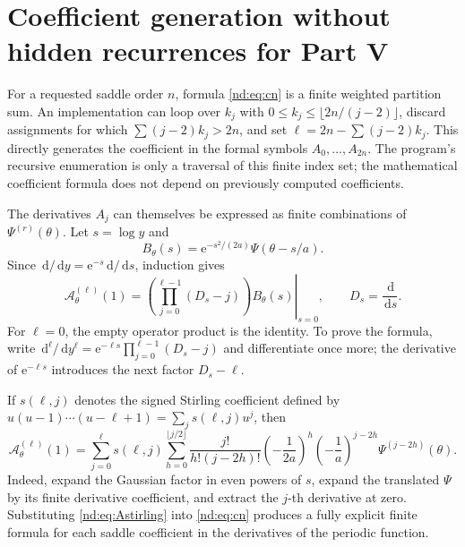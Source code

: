 \documentclass[11pt,a4paper,oneside,openany]{book}
\numberwithin{equation}{chapter}
\theoremstyle{definition}
\theoremstyle{remark}
\newcommand{\dd}{\,\mathrm d}
\newcommand{\e}{\mathrm e}
\begin{document}
\chapter{Coefficient generation without hidden recurrences for Part V}
\label{nd:app:coefficients}

For a requested saddle order \(n\), formula \eqref{nd:eq:cn} is a finite weighted
partition sum. An implementation can loop over \(k_j\) with
\(0\le k_j\le\lfloor2n/(j-2)\rfloor\), discard assignments for which
\(\sum(j-2)k_j>2n\), and set
\(\ell=2n-\sum(j-2)k_j\). This directly generates the coefficient in the
formal symbols \(A_0,\ldots,A_{2n}\). The program's recursive enumeration is
only a traversal of this finite index set; the mathematical coefficient formula
does not depend on previously computed coefficients.

The derivatives \(A_j\) can themselves be expressed as finite combinations of
\(\Psi^{(r)}(\theta)\). Let \(s=\log y\) and
\[
 B_\theta(s)=\e^{-s^2/(2a)}\Psi(\theta-s/a).
\]
Since \(\dd/\dd y=\e^{-s}\dd/\dd s\), induction gives
\begin{equation}
 \mathcal A_\theta^{(\ell)}(1)
 =\left.\left(\prod_{j=0}^{\ell-1}(D_s-j)\right)
                            B_\theta(s)\right|_{s=0},
 \qquad D_s=\frac{\dd}{\dd s}.
 \label{nd:eq:Aoperator}
\end{equation}
For \(\ell=0\), the empty operator product is the identity. To prove the
formula, write
\(\dd^\ell/\dd y^\ell=\e^{-\ell s}\prod_{j=0}^{\ell-1}(D_s-j)\)
and differentiate once more; the derivative of \(\e^{-\ell s}\) introduces
the next factor \(D_s-\ell\).

If \(s(\ell,j)\) denotes the signed Stirling coefficient defined by
\(u(u-1)\cdots(u-\ell+1)=\sum_js(\ell,j)u^j\), then
\begin{equation}
 \mathcal A_\theta^{(\ell)}(1)
 =\sum_{j=0}^{\ell}s(\ell,j)
   \sum_{h=0}^{\lfloor j/2\rfloor}
       \frac{j!}{h!(j-2h)!}
       \left(-\frac1{2a}\right)^h
       \left(-\frac1a\right)^{j-2h}
       \Psi^{(j-2h)}(\theta).
 \label{nd:eq:Astirling}
\end{equation}
Indeed, expand the Gaussian factor in even powers of \(s\), expand the
translated \(\Psi\) by its finite derivative coefficient, and extract the
\(j\)-th derivative at zero. Substituting \eqref{nd:eq:Astirling} into
\eqref{nd:eq:cn} produces a fully explicit finite formula for each saddle
coefficient in the derivatives of the periodic function.
\end{document}
